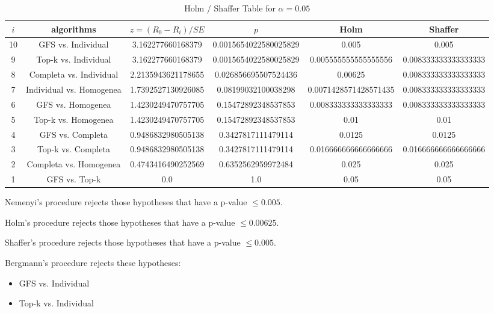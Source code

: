 \documentclass[a4paper,10pt]{article}
\begin{document}
\begin{landscape}
\begin{table}[!htp]
\centering\tiny
\caption{Holm / Shaffer Table for $\alpha=0.05$}
\begin{tabular}{cccccc}
$i$&algorithms&$z=(R_0 - R_i)/SE$&$p$&Holm&Shaffer\\
\hline
10&GFS vs. Individual&3.162277660168379&0.0015654022580025829&0.005&0.005\\
9&Top-k vs. Individual&3.162277660168379&0.0015654022580025829&0.005555555555555556&0.008333333333333333\\
8&Completa vs. Individual&2.2135943621178655&0.026856695507524436&0.00625&0.008333333333333333\\
7&Individual vs. Homogenea&1.7392527130926085&0.08199032100038298&0.0071428571428571435&0.008333333333333333\\
6&GFS vs. Homogenea&1.4230249470757705&0.15472892348537853&0.008333333333333333&0.008333333333333333\\
5&Top-k vs. Homogenea&1.4230249470757705&0.15472892348537853&0.01&0.01\\
4&GFS vs. Completa&0.9486832980505138&0.3427817111479114&0.0125&0.0125\\
3&Top-k vs. Completa&0.9486832980505138&0.3427817111479114&0.016666666666666666&0.016666666666666666\\
2&Completa vs. Homogenea&0.4743416490252569&0.6352562959972484&0.025&0.025\\
1&GFS vs. Top-k&0.0&1.0&0.05&0.05\\
\hline
\end{tabular}
\end{table}
Nemenyi's procedure rejects those hypotheses that have a p-value $\le0.005$.


Holm's procedure rejects those hypotheses that have a p-value $\le0.00625$.


Shaffer's procedure rejects those hypotheses that have a p-value $\le0.005$.


Bergmann's procedure rejects these hypotheses:


\begin{itemize}


\item GFS vs. Individual
\item Top-k vs. Individual
\end{itemize}



\end{landscape}
\end{document}
